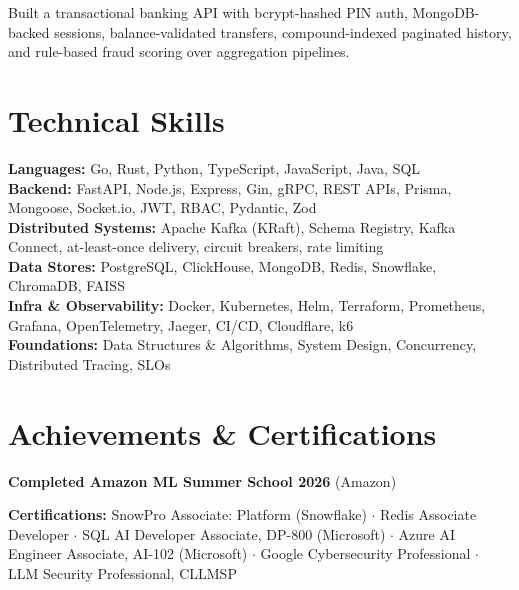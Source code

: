 \documentclass[a4paper,10pt]{article}
\begin{document}
\begin{points}
  \item Built a transactional banking API with bcrypt-hashed PIN auth, MongoDB-backed sessions, balance-validated transfers, compound-indexed paginated history, and rule-based fraud scoring over aggregation pipelines.
\end{points}

\section{Technical Skills}
{\small
\textbf{Languages:} Go, Rust, Python, TypeScript, JavaScript, Java, SQL\\
\textbf{Backend:} FastAPI, Node.js, Express, Gin, gRPC, REST APIs, Prisma, Mongoose, Socket.io, JWT, RBAC, Pydantic, Zod\\
\textbf{Distributed Systems:} Apache Kafka (KRaft), Schema Registry, Kafka Connect, at-least-once delivery, circuit breakers, rate limiting\\
\textbf{Data Stores:} PostgreSQL, ClickHouse, MongoDB, Redis, Snowflake, ChromaDB, FAISS\\
\textbf{Infra \& Observability:} Docker, Kubernetes, Helm, Terraform, Prometheus, Grafana, OpenTelemetry, Jaeger, CI/CD, Cloudflare, k6\\
\textbf{Foundations:} Data Structures \& Algorithms, System Design, Concurrency, Distributed Tracing, SLOs}

\section{Achievements \& Certifications}
\begin{points}
  \item \ieeepaper
  \item \textbf{Completed Amazon ML Summer School 2026} (Amazon)
\end{points}
\vspace{2pt}
{\small\textbf{Certifications:} SnowPro Associate: Platform (Snowflake) $\cdot$ Redis Associate Developer $\cdot$ SQL AI Developer Associate, DP-800 (Microsoft) $\cdot$ Azure AI Engineer Associate, AI-102 (Microsoft) $\cdot$ Google Cybersecurity Professional $\cdot$ LLM Security Professional, CLLMSP}
\end{document}
